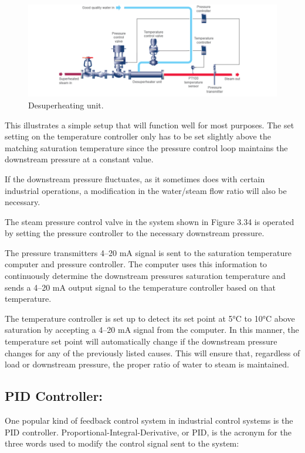 \begin{figure}[h!]
  \centering
  \includegraphics[width=0.7\linewidth]{figs/control_instrumentation/image7.png}
  \caption{Desuperheating unit.}
  \label{fig:Desuperheating unit}
\end{figure}


This illustrates a simple setup that will function well for most
purposes. The set setting on the temperature controller only has to be
set slightly above the matching saturation temperature since the
pressure control loop maintains the downstream pressure at a constant
value.

If the downstream pressure fluctuates, as it sometimes does with certain
industrial operations, a modification in the water/steam flow ratio will
also be necessary.

The steam pressure control valve in the system shown in Figure 3.34 is
operated by setting the pressure controller to the necessary downstream
pressure.

The pressure transmitter\textquotesingle s 4--20 mA signal is sent to
the saturation temperature computer and pressure controller. The
computer uses this information to continuously determine the downstream
pressure\textquotesingle s saturation temperature and sends a 4--20 mA
output signal to the temperature controller based on that temperature.

The temperature controller is set up to detect its set point at 5°C to
10°C above saturation by accepting a 4--20 mA signal from the computer.
In this manner, the temperature set point will automatically change if
the downstream pressure changes for any of the previously listed causes.
This will ensure that, regardless of load or downstream pressure, the
proper ratio of water to steam is maintained.


\subsection{PID Controller:}

One popular kind of feedback control system in industrial control
systems is the PID controller. Proportional-Integral-Derivative, or PID,
is the acronym for the three words used to modify the control signal
sent to the system:

